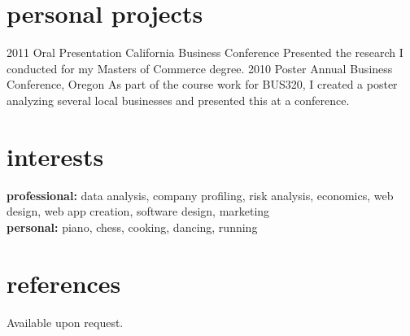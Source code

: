 \documentclass[hidelinks]{kkurucz-cv}
\begin{document}

\section{personal projects}
\begin{entrylist}
\entry
{2011}
{Oral Presentation}
{California Business Conference}
{Presented the research I conducted for my Masters of Commerce degree.}
{\null}
\entry
{2010}
{Poster}
{Annual Business Conference, Oregon}
{As part of the course work for BUS320, I created a poster analyzing several local businesses and presented this at a conference.}
{\null}
\end{entrylist}


\section{interests}

\textbf{professional:} data analysis, company profiling, risk analysis, economics, web design, web app creation, software design, marketing
\\
\textbf{personal:} piano, chess, cooking, dancing, running

\section{references}
{Available upon request.}
\end{document}
